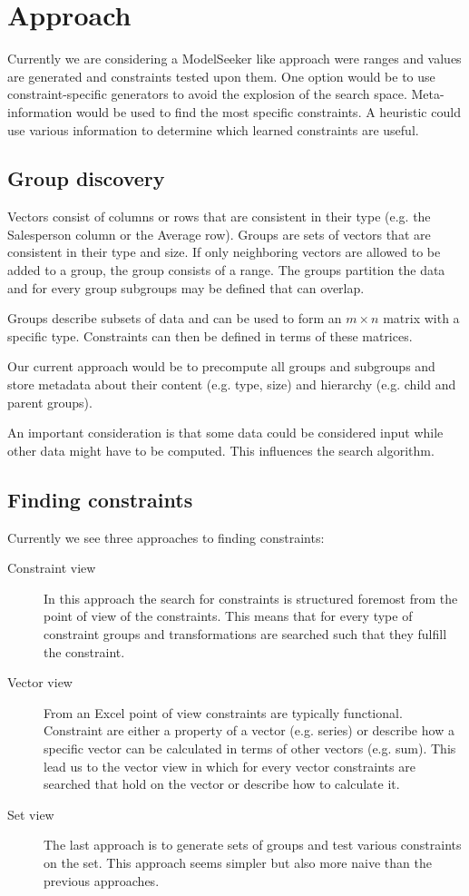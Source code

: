 \documentclass[a4paper]{article}
\begin{document}

\section{Approach} %
\label{sec:approach}

Currently we are considering a ModelSeeker like approach were ranges and values are generated and constraints tested upon them.
One option would be to use constraint-specific generators to avoid the explosion of the search space.
Meta-information would be used to find the most specific constraints.
A heuristic could use various information to determine which learned constraints are useful.

\subsection{Group discovery}
Vectors consist of columns or rows that are consistent in their type (e.g. the Salesperson column or the Average row).
Groups are sets of vectors that are consistent in their type and size.
If only neighboring vectors are allowed to be added to a group, the group consists of a range.
The groups partition the data and for every group subgroups may be defined that can overlap.

Groups describe subsets of data and can be used to form an $m \times n$ matrix with a specific type.
Constraints can then be defined in terms of these matrices.

Our current approach would be to precompute all groups and subgroups and store metadata about their content (e.g. type, size) and hierarchy (e.g. child and parent groups).

An important consideration is that some data could be considered input while other data might have to be computed.
This influences the search algorithm.

\subsection{Finding constraints}
Currently we see three approaches to finding constraints:

\begin{description}
	\item[Constraint view] In this approach the search for constraints is structured foremost from the point of view of the constraints.
	This means that for every type of constraint groups and transformations  are searched such that they fulfill the constraint.
	\item[Vector view] From an Excel point of view constraints are typically functional.
	Constraint are either a property of a vector (e.g. series) or describe how a specific vector can be calculated in terms of other vectors (e.g. sum).
	This lead us to the vector view in which for every vector constraints are searched that hold on the vector or describe how to calculate it.
	\item[Set view] The last approach is to generate sets of groups and test various constraints on the set.
	This approach seems simpler but also more naive than the previous approaches.
\end{description}
\end{document}

